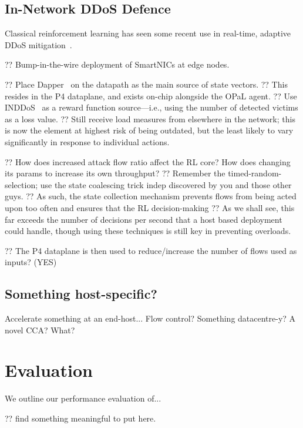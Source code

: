 \documentclass[sigconf,natbib=false]{acmart}
\newcommand{\approachshort}{OPaL}
\begin{document}
\subsection{In-Network DDoS Defence}\label{sec:integ-1}
Classical reinforcement learning has seen some recent use in real-time, adaptive DDoS mitigation~\parencite{DBLP:journals/tnsm/SimpsonRP20}.

?? Bump-in-the-wire deployment of SmartNICs at edge nodes.

?? Place Dapper~\parencite{DBLP:conf/sosr/GhasemiBR17} on the datapath as the main source of state vectors.
?? This resides in the P4 dataplane, and exists on-chip alongside the \approachshort{} agent.
?? Use INDDoS~\parencite{tnms-ddos-victim-ident} as a reward function source---i.e., using the number of detected victims as a loss value.
?? Still receive load measures from elsewhere in the network; this is now the element at highest risk of being outdated, but the least likely to vary significantly in response to individual actions.

?? How does increased attack flow ratio affect the RL core? How does changing its params to increase its own throughput?
?? Remember the timed-random-selection; use the state coalescing trick indep discovered by you and those other guys.
?? As such, the state collection mechanism prevents flows from being acted upon too often and ensures that the RL decision-making
?? As we shall see, this far exceeds the number of decisions per second that a host based deployment could handle, though using these techniques is still key in preventing overloads.

?? The P4 dataplane is then used to reduce/increase the number of flows used as inputs? (YES)

\subsection{Something host-specific?}\label{sec:integ-2}
Accelerate something at an end-host... Flow control? Something datacentre-y? A novel CCA? What?

\section{Evaluation}\label{sec:evaluation}
We outline our performance evaluation of...

?? find something meaningful to put here.
\end{document}
